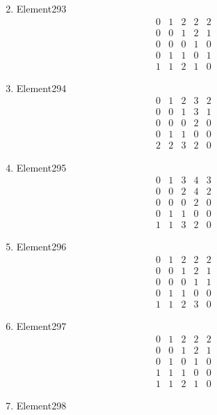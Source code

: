 \documentclass[12pt]{article}
\begin{document}
\begin{multicols}{3}
\begin{enumerate}
\begin{equation*}
\end{equation*}
\item Element293
\begin{equation*}
\begin{array}{ccccc}
0&1&2&2&2\\
0&0&1&2&1\\
0&0&0&1&0\\
0&1&1&0&1\\
1&1&2&1&0
\end{array}
\end{equation*}
\item Element294
\begin{equation*}
\begin{array}{ccccc}
0&1&2&3&2\\
0&0&1&3&1\\
0&0&0&2&0\\
0&1&1&0&0\\
2&2&3&2&0
\end{array}
\end{equation*}
\item Element295
\begin{equation*}
\begin{array}{ccccc}
0&1&3&4&3\\
0&0&2&4&2\\
0&0&0&2&0\\
0&1&1&0&0\\
1&1&3&2&0
\end{array}
\end{equation*}
\item Element296
\begin{equation*}
\begin{array}{ccccc}
0&1&2&2&2\\
0&0&1&2&1\\
0&0&0&1&1\\
0&1&1&0&0\\
1&1&2&3&0
\end{array}
\end{equation*}
\item Element297
\begin{equation*}
\begin{array}{ccccc}
0&1&2&2&2\\
0&0&1&2&1\\
0&1&0&1&0\\
1&1&1&0&0\\
1&1&2&1&0
\end{array}
\end{equation*}
\item Element298

\end{enumerate}
\end{multicols}
\end{document}
